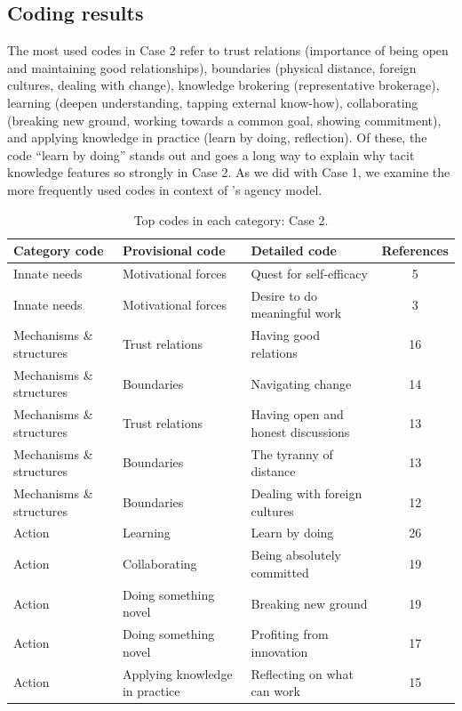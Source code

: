 \subsection{Coding results}

The most used codes in Case 2 refer to trust relations (importance of being open and maintaining good relationships), boundaries (physical distance, foreign cultures, dealing with change), knowledge brokering (representative brokerage), learning (deepen understanding, tapping external know-how), collaborating (breaking new ground, working towards a common goal, showing commitment), and applying knowledge in practice (learn by doing, reflection). Of these, the code \enquote{learn by doing} stands out and goes a long way to explain why tacit knowledge features so strongly in Case 2. As we did with Case 1, we examine the more frequently used codes in context of \citet{loyal2001agency}'s agency model.

\begin{table}
\centering
\caption{Top codes in each category: Case 2.}
\label{tab:case_2_codes}
\begin{tabular}{lllc}
\toprule
Category code & Provisional code & Detailed code & References \\ 
\midrule
Innate needs & Motivational forces & Quest for self-efficacy &   5 \\ 
Innate needs & Motivational forces & Desire to do meaningful work &   3 \\
Mechanisms \& structures & Trust relations & Having good relations &  16 \\ 
Mechanisms \& structures & Boundaries & Navigating change &  14 \\ 
Mechanisms \& structures & Trust relations & Having open and honest discussions &  13 \\ 
Mechanisms \& structures & Boundaries & The tyranny of distance &  13 \\ 
Mechanisms \& structures & Boundaries & Dealing with foreign cultures &  12 \\
Action & Learning & Learn by doing &  26 \\ 
Action & Collaborating & Being absolutely committed &  19 \\ 
Action & Doing something novel & Breaking new ground &  19 \\ 
Action & Doing something novel & Profiting from innovation &  17 \\ 
Action & Applying knowledge in practice & Reflecting on what can work &  15 \\ 
\bottomrule
\end{tabular}
\end{table}

